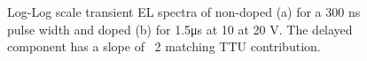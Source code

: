 \documentclass[
  letterpaper,
  DIV=11,
  numbers=noendperiod,
  oneside]{scrreprt}
\begin{document}
\begin{figure}

\begin{minipage}[t]{0.50\linewidth}

{\centering 


}

\subcaption{\label{fig-dpaslopefit}}
\end{minipage}%
%
\begin{minipage}[t]{0.50\linewidth}

{\centering 


}

\subcaption{\label{fig-mcbpfit}}
\end{minipage}%

\caption{\label{fig-slopefit}Log-Log scale transient EL spectra of
non-doped (a) for a 300 ns pulse width and doped (b) for 1.5{μs} at 10
at 20 V. The delayed component has a slope of ~2 matching TTU
contribution.}

\end{figure}
\end{document}
